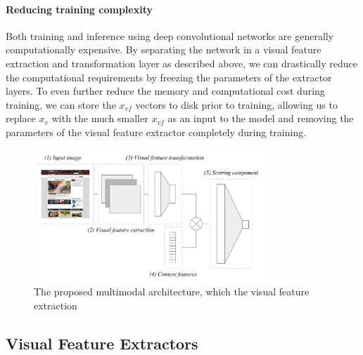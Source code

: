 
\paragraph{Reducing training complexity}
Both training and inference using deep convolutional networks are generally computationally expensive.
By separating the network in a visual feature extraction and transformation layer as described above, we can drastically reduce the computational requirements by freezing the parameters of the extractor layers.
To even further reduce the memory and computational cost during training, we can store the $x_{vf}$ vectors to disk prior to training, allowing us to replace $x_{v}$ with the much smaller $x_{vf}$ as an input to the model and removing the parameters of the visual feature extractor completely during training.




\begin{figure}[t]
\includegraphics[width = 3.5in]{images/multimodelarchitecture.pdf}
\caption{The proposed multimodal architecture, which the visual feature extraction}
\label{fig:multimodelarchitecture}
\end{figure}


\subsection{Visual Feature Extractors}
